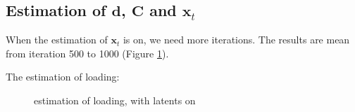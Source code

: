 \documentclass[]{article}
\begin{document}
\subsection{Estimation of \(\mathbf{d}\), \(\mathbf{C}\) and \(\mathbf{x}_{t}\)}
When the estimation of \(\mathbf{x}_t\) is on, we need more iterations. The results are mean from iteration 500 to 1000 (Figure \ref{loading and latent}).

The estimation of loading:
\begin{figure}[h!]
	\caption{estimation of loading, with latents on}
	\label{loading and latent}
\end{figure}
\end{document}
